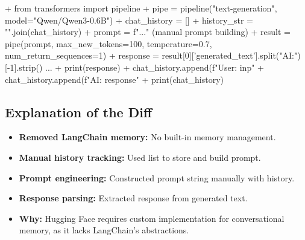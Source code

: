 \documentclass[11pt, a4paper]{article}
\begin{document}
\begin{addedcode}
\begin{diffverb}
+ from transformers import pipeline
+ pipe = pipeline("text-generation", model="Qwen/Qwen3-0.6B")
+ chat_history = []
+ history_str = "\n".join(chat_history)
+ prompt = f"..." (manual prompt building)
+ result = pipe(prompt, max_new_tokens=100, temperature=0.7, num_return_sequences=1)
+ response = result[0]['generated_text'].split("AI:")[-1].strip() ...
+ print(response)
+ chat_history.append(f"User: {inp}"
+ chat_history.append(f"AI: {response}"
+ print(chat_history)
\end{diffverb}
\end{addedcode}


\subsection{Explanation of the Diff}
\begin{itemize}
    \item \textbf{Removed LangChain memory:} No built-in memory management.
    \item \textbf{Manual history tracking:} Used list to store and build prompt.
    \item \textbf{Prompt engineering:} Constructed prompt string manually with history.
    \item \textbf{Response parsing:} Extracted response from generated text.
    \item \textbf{Why:} Hugging Face requires custom implementation for conversational memory, as it lacks LangChain's abstractions.
\end{itemize}


\newpage
\end{document}
